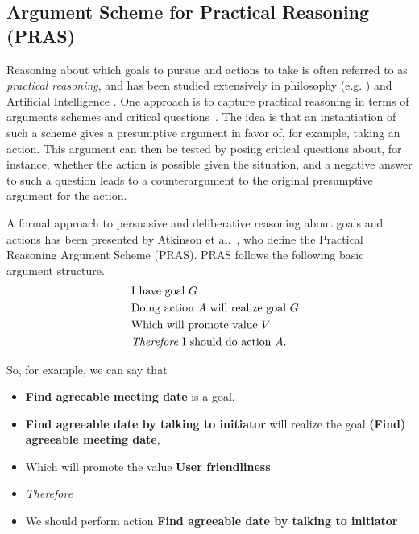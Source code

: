 \subsection{Argument Scheme for Practical Reasoning (PRAS)}
\label{sect:background:pras}

Reasoning about which goals to pursue and actions to take is often referred to as \emph{practical reasoning}, and has been studied extensively in philosophy (e.g. \cite{Raz1978-RAZPR,walton1990}) and Artificial Intelligence \cite{Bratman1987,atkinson2007}. One approach is to capture practical reasoning in terms of arguments schemes and critical questions~\cite{walton1990}. The idea is that an instantiation of such a scheme gives a presumptive argument in favor of, for example, taking an action. This argument can then be tested by posing critical questions about, for instance, whether the action is possible given the situation, and a negative answer to such a question leads to a counterargument to the original presumptive argument for the action. 

A formal approach to persuasive and deliberative reasoning about goals and actions has been presented by Atkinson et al.~\cite{atkinson2007}, who define the Practical Reasoning Argument Scheme (PRAS). PRAS follows the following basic argument structure. 
\begin{equation}
\label{eq:eq1}
  \begin{aligned}
 \qquad&\text{I have goal } G&\\
&\text{Doing action }A \text{ will realize goal }G&\\
&\text{Which will promote value }V&\\
&\text{\emph{Therefore} I should do action }A.&
  \end{aligned}
\end{equation}

So, for example, we can say that 
\begin{itemize}
\item[] \textbf{Find agreeable meeting date} is a goal,
\item[] \textbf{Find agreeable date by talking to initiator} will realize the goal \textbf{(Find) agreeable meeting date},
\item[] Which will promote the value \textbf{User friendliness}
\item[] \textit{Therefore} 
\item[] We should perform action \textbf{Find agreeable date by talking to initiator}
\end{itemize}

